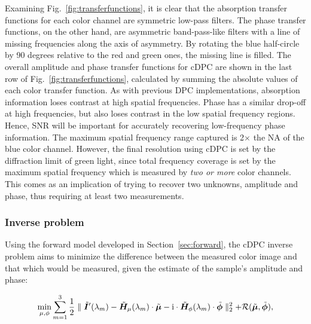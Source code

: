 Examining Fig.~\ref{fig:transferfunctions}, it is clear that the absorption transfer functions for each color channel are symmetric low-pass filters. The phase transfer functions, on the other hand, are asymmetric band-pass-like filters with a line of missing frequencies along the axis of asymmetry. By rotating the blue half-circle by 90 degrees relative to the red and green ones, the missing line is filled. The overall amplitude and phase transfer functions for cDPC are shown in the last row of Fig.~\ref{fig:transferfunctions}, calculated by summing the absolute values of each color transfer function. As with previous DPC implementations, absorption information loses contrast at high spatial frequencies. Phase has a similar drop-off at high frequencies, but also loses contrast in the low spatial frequency regions. Hence, SNR will be important for accurately recovering low-frequency phase information. The maximum spatial frequency range captured is 2$\times$ the NA of the blue color channel. However, the final resolution using cDPC is set by the diffraction limit of green light, since total frequency coverage is set by the maximum spatial frequency which is measured by \textit{two or more} color channels. This comes as an implication of trying to recover two unknowns, amplitude and phase, thus requiring at least two measurements.

\subsubsection{Inverse problem}
Using the forward model developed in Section~\ref{sec:forward}, the cDPC inverse problem aims to minimize the difference between the measured color image and that which would be measured, given the estimate of the sample's amplitude and phase:

\begin{equation}\label{eq:objectivefunction}
\begin{split}
\min_{\mu,\phi} \sum_{m=1}^{3}\frac{1}{2} \parallel\tilde{\bm{I}}'(\lambda_m) - \tilde{\bm{H}}_{\mu}(\lambda_m)\cdot \tilde{\bm{\mu}} - \mathrm{i}\cdot\tilde{\bm{H}}_{\phi}(\lambda_m)\cdot \tilde{\bm{\phi}} \parallel_2^2 + \mathcal{R}(\tilde{\bm{\mu}},\tilde{\bm{\phi}}),
\end{split}
\end{equation}


